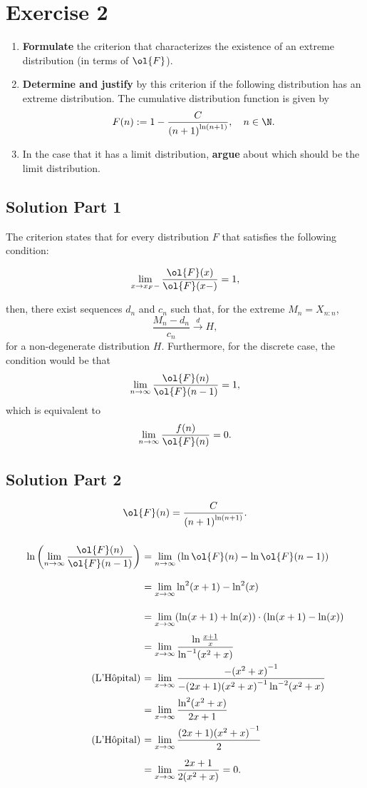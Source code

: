 \section{Exercise 2}

\begin{enumerate}
    \item \textbf{Formulate} the criterion that characterizes the existence of an extreme distribution (in terms of $\ol{F}$).
    \item \textbf{Determine and justify} by this criterion if the following distribution has an extreme distribution. The cumulative distribution function is given by
    \[  F(n) := 1-\frac{C}{{(n+1)}^{\ln (n+1)}} ,\hspace*{1em} n\in\N.\]
    \item In the case that it has a limit distribution, \textbf{argue} about which should be the limit distribution.
\end{enumerate}

\subsection*{Solution Part 1}

The criterion states that for every distribution $F$ that satisfies the following condition:

\[ \lim_{x\to x_F-} \frac{\ol{F}(x)}{\ol{F}(x-)} = 1, \]

then, there exist sequences $d_n$ and $c_n$ such that, for the extreme $M_n = X_{n:n}$,
\[ \frac{M_n - d_n}{c_n} \overset{d}{\to} H, \]
for a non-degenerate distribution $H$. Furthermore, for the discrete case, the condition would be that
\[ \lim_{n\to \infty} \frac{\ol{F}(n)}{\ol{F}(n-1)} = 1, \]
which is equivalent to
\[ \lim_{n\to\infty} \frac{f(n)}{\ol{F}(n)} = 0. \]

\subsection*{Solution Part 2}

\[ \ol{F}(n) = \frac{C}{{(n+1)}^{\ln(n+1)}}. \]

\[ \everymath{\displaystyle}
\arraycolsep=1.8pt\def\arraystretch{2.5}
\begin{array}{rl}
    \ln \left( \lim_{n\to\infty} \frac{\ol{F}(n)}{\ol{F}(n-1)}  \right) & = \lim_{n\to\infty} \left( \ln \ol{F}(n) - \ln \ol{F}(n-1)\right)\\
    & = \lim_{x\to\infty} \ln^2(x+1) - \ln^{2}(x)\\
    & = \lim_{x\to\infty} (\ln(x+1) + \ln(x)) \cdot (\ln(x+1) - \ln(x))\\
    & = \lim_{x\to\infty} \frac{\ln\frac{x+1}{x}}{\ln^{-1}(x^2 + x)}\\ \text{(L'Hôpital)}
    & = \lim_{x\to\infty} \frac{-{(x^2 + x)}^{-1}}{-(2x+1){(x^2 + x)}^{-1} \ln^{-2}(x^2+x)}\\
    & = \lim_{x\to\infty} \frac{\ln^{2}(x^2+x)}{2x+1}\\ \text{(L'Hôpital)}
    & = \lim_{x\to\infty} \frac{(2x+1){(x^2+x)}^{-1}}{2}\\
    & = \lim_{x\to\infty} \frac{2x+1}{2(x^2+x)} = 0.
\end{array} \]

